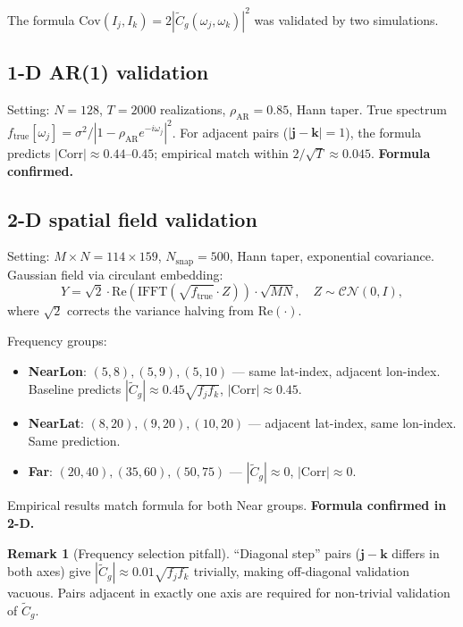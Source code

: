 \documentclass[12pt]{article}
\theoremstyle{definition}
\newtheorem{remark}{Remark}
\begin{document}
The formula
$\mathrm{Cov}(I_j, I_k) = 2|\tilde{C}_g(\omega_j,\omega_k)|^2$
was validated by two simulations.

\subsection{1-D AR(1) validation}

Setting: $N=128$, $T=2000$ realizations, $\rho_{\mathrm{AR}}=0.85$,
Hann taper. True spectrum $f_{\mathrm{true}}[\omega_j]
= \sigma^2/|1-\rho_{\mathrm{AR}}e^{-i\omega_j}|^2$.
For adjacent pairs ($|\mathbf{j}-\mathbf{k}|=1$), the formula predicts
$|\mathrm{Corr}| \approx 0.44$--$0.45$; empirical match within
$2/\sqrt{T} \approx 0.045$.
\textbf{Formula confirmed.}

\subsection{2-D spatial field validation}

Setting: $M\times N = 114\times 159$, $N_{\mathrm{snap}}=500$, Hann taper,
exponential covariance. Gaussian field via circulant embedding:
\[
  Y = \sqrt{2}\cdot\mathrm{Re}\!\left(\mathrm{IFFT}\!\left(\sqrt{f_{\mathrm{true}}}\cdot Z\right)\right)\cdot\sqrt{MN},
  \quad Z\sim\mathcal{CN}(0,I),
\]
where $\sqrt{2}$ corrects the variance halving from $\mathrm{Re}(\cdot)$.

Frequency groups:
\begin{itemize}
  \item \textbf{NearLon}: $(5,8),(5,9),(5,10)$ --- same lat-index, adjacent lon-index.
        Baseline predicts $|\tilde{C}_g| \approx 0.45\sqrt{f_jf_k}$,
        $|\mathrm{Corr}| \approx 0.45$.
  \item \textbf{NearLat}: $(8,20),(9,20),(10,20)$ --- adjacent lat-index,
        same lon-index. Same prediction.
  \item \textbf{Far}: $(20,40),(35,60),(50,75)$ ---
        $|\tilde{C}_g| \approx 0$, $|\mathrm{Corr}| \approx 0$.
\end{itemize}
Empirical results match formula for both Near groups.
\textbf{Formula confirmed in 2-D.}

\begin{remark}[Frequency selection pitfall]
``Diagonal step'' pairs ($\mathbf{j}-\mathbf{k}$ differs in both axes) give
$|\tilde{C}_g| \approx 0.01\sqrt{f_jf_k}$ trivially, making off-diagonal
validation vacuous.
Pairs adjacent in exactly one axis are required for non-trivial
validation of $\tilde{C}_g$.
\end{remark}
\end{document}
